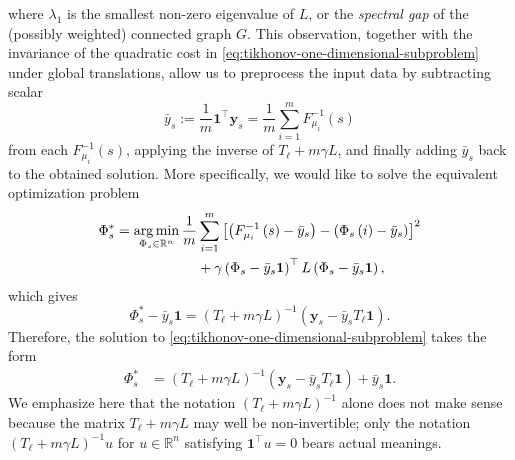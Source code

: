 \documentclass[letterpaper]{article} %
\begin{document}
where $\lambda_1$ is the smallest non-zero eigenvalue of $L$, or the \emph{spectral gap} of the (possibly weighted) connected graph $G$. %
This observation, together with the invariance of the quadratic cost in \eqref{eq:tikhonov-one-dimensional-subproblem} under global translations, allow us to preprocess the input data by subtracting scalar
\begin{equation}
  \label{eq:off-set-defn}
  \bar{y}_s := \frac{1}{m}\mathbf{1}^{\top}\mathbf{y}_s=\frac{1}{m}\sum_{i=1}^mF_{\mu_i}^{-1}\left( s \right)
\end{equation}
from each $F_{\mu_i}^{-1}\left( s \right)$, applying the inverse of $T_\ell+m\gamma L$, and finally adding $\bar{y}_s$ back to the obtained solution. More specifically, we would like to solve the equivalent optimization problem
\begin{equation}
  \label{eq:tikhonov-one-dimensional-subproblem-equiv}
  \begin{aligned}
    \Phi_s^*=\mathop{\rm arg\, min}_{\Phi_s\in\mathbb{R}^n}\frac{1}{m}&\sum_{i=1}^m \left[\left( F_{\mu_i}^{-1}\left( s \right)-\bar{y}_s\right)-\left(\Phi_s \left( i \right)-\bar{y}_s \right)\right]^2\\
    &+\gamma \left(\Phi_s-\bar{y}_s\mathbf{1}\right)^{\top}L\left(\Phi_s-\bar{y}_s\mathbf{1}\right),
  \end{aligned}
\end{equation}
which gives
\begin{equation*}
  \Phi_s^*-\bar{y}_s\mathbf{1}=\left( T_{\ell}+m\gamma L \right)^{-1}\left(\mathbf{y}_s-\bar{y}_sT_\ell\mathbf{1}\right).
\end{equation*}
Therefore, the solution to \eqref{eq:tikhonov-one-dimensional-subproblem} takes the form
\begin{equation}
  \label{eq:sol-tikhonov-one-dimensional-subproblem}
  \begin{aligned}
    \Phi_s^{*}&=\left( T_{\ell}+m\gamma L \right)^{-1}\left(\mathbf{y}_s-\bar{y}_sT_\ell\mathbf{1}\right)+\bar{y}_s\mathbf{1}.
  \end{aligned}
\end{equation}
We emphasize here that the notation $\left( T_{\ell}+m\gamma L \right)^{-1}$ alone does not make sense because the matrix $T_{\ell}+m\gamma L$ may well be non-invertible; only the notation $\left( T_{\ell}+m\gamma L \right)^{-1}u$ for $u\in\mathbb{R}^n$ satisfying $\mathbf{1}^{\top}u=0$ bears actual meanings.
\end{document}

